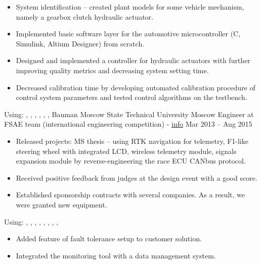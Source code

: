 \begin{itemize}
    \item System identification -- created plant models for some vehicle mechanism, namely a gearbox clutch hydraulic actuator.
    \item Implemented basic software layer for the automotive microcontroller (C, Simulink, Altium Designer) from scratch.
    \item Designed and implemented a controller for hydraulic actuators with further improving quality metrics and decreasing system setting time.
    \item Decreased calibration time by developing automated calibration procedure of control system parameters and tested control algorithms on the testbench.
\end{itemize}
Using: , , , , , , 
\horizontalline
% 
\ressubheading
{Bauman Moscow State Technical University}
{}
{Moscow}
{Engineer at FSAE team (international engineering competition) - \href{https://baumanracing.ru/en/}{info}}
{Mar 2013 -- Aug 2015}
\begin{itemize}
    \item Released projects: MS thesis -- using RTK navigation for telemetry, F1-like steering wheel with integrated LCD, wireless telemetry module, signals expansion module by reverse-engineering the race ECU CANbus protocol.
    \item Received positive feedback from judges at the design event with a good score.
    \item Established sponsorship contracts with several companies. As a result, we were granted new equipment.
\end{itemize}
Using: , , , , , , , , 
\horizontalline
% 
\begin{itemize}
    \item Added feature of fault tolerance setup to customer solution.
    \item Integrated the monitoring tool with a data management system.
\end{itemize}
